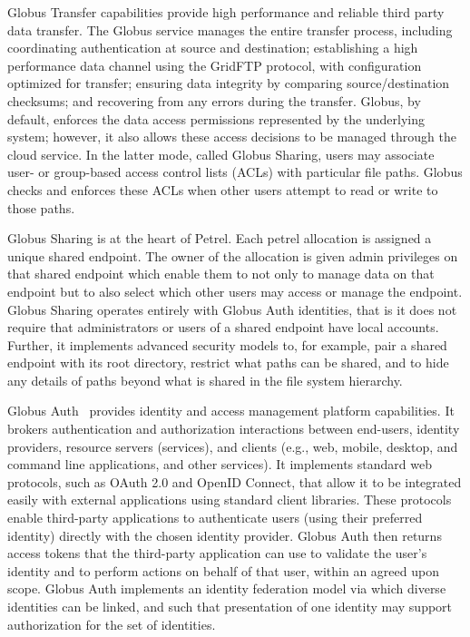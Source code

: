 \documentclass[sigconf]{acmart}
\begin{document}
Globus Transfer capabilities provide high performance and reliable third party data transfer. 
The Globus service manages the entire transfer process, including coordinating authentication at source and destination; establishing a high performance data channel using  the GridFTP protocol, with configuration optimized for transfer; ensuring data integrity by comparing source/destination checksums; and recovering from any errors during the transfer.  Globus, by default, enforces the data access permissions represented
by the underlying system; however, it also allows these access decisions to be managed through the cloud service. In the latter mode, called Globus Sharing, users may associate user- or group-based access control lists (ACLs) with particular file paths. Globus checks and enforces these ACLs when other users attempt to read or write to those paths.

Globus Sharing is at the heart of Petrel. Each petrel allocation is assigned
a unique shared endpoint. The owner of the allocation is given admin privileges
on that shared endpoint which enable them to not only to manage data on
that endpoint but to also select which other users may access or manage the endpoint. 
Globus Sharing operates entirely with Globus Auth identities, that is it does
not require that administrators or users of a shared endpoint have local accounts. 
Further, it implements advanced security models to, for example, pair
a shared endpoint with its root directory, restrict what paths can 
be shared, and to hide any details of paths beyond what is shared in the
file system hierarchy.

Globus Auth~\cite{tuecke16auth} provides identity and access management platform capabilities. It brokers authentication and authorization interactions between end-users, identity providers, resource servers (services), and clients (e.g., web, mobile, desktop, and command line applications, and other services). 
It implements standard web protocols, such as OAuth 2.0 and OpenID Connect, that allow it to be integrated easily with external applications using standard client libraries. 
These protocols enable third-party applications to authenticate users (using their preferred identity) directly with the chosen identity provider. Globus Auth then returns access
tokens that the third-party application can use to validate the user's identity and to perform actions on behalf of that user, within an agreed upon scope. Globus Auth implements an identity federation model via which diverse identities can be linked, and such that presentation of one identity may support authorization for the set of identities. 
\end{document}
